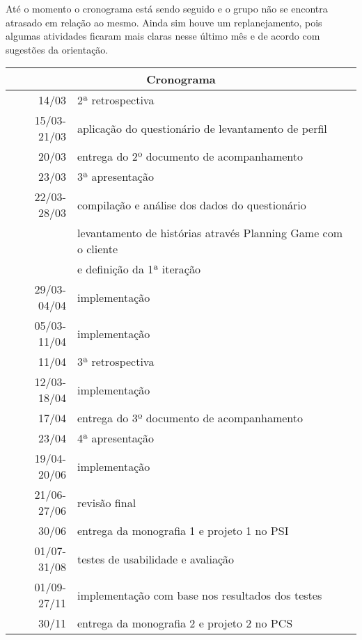 \documentclass[a4paper,12pt,font=plain,header=plain]{abnt}
\begin{document}
		Até o momento o cronograma está sendo seguido e o grupo não se encontra atrasado em relação ao mesmo. Ainda sim houve um replanejamento, pois algumas atividades ficaram mais claras nesse último mês e de acordo com sugestões da orientação.					
		
		\begin{tabular}[|l|]{ |r|l| }
		\hline
			\multicolumn{2}{|c|}{\textbf{Cronograma}} \\
		\hline
			14/03 & 2ª retrospectiva \\
		\hline
			15/03-21/03 & aplicação do questionário de levantamento de perfil \\
		\hline
			20/03 & entrega do 2º documento de acompanhamento \\
		\hline
			23/03 & 3ª apresentação \\
		\hline
			22/03-28/03 & compilação e análise dos dados do questionário \\
			 & levantamento de histórias através Planning Game com o cliente \\ 
			 & e definição da 1ª iteração \\
		\hline
			29/03-04/04 & implementação \\
		\hline
			05/03-11/04 & implementação \\
		\hline
			11/04 & 3ª retrospectiva \\
		\hline
			12/03-18/04 & implementação \\
		\hline
			17/04 & entrega do 3º documento de acompanhamento \\
		\hline
			23/04 & 4ª apresentação \\
		\hline
			19/04-20/06 & implementação \\
		\hline
			21/06-27/06 & revisão final \\
		\hline
			30/06 & entrega da monografia 1 e projeto 1 no PSI \\
		\hline
			01/07-31/08 & testes de usabilidade e avaliação \\
		\hline
			01/09-27/11 & implementação com base nos resultados dos testes \\
		\hline
			30/11 & entrega da monografia 2 e projeto 2 no PCS \\
		\hline
		\end{tabular} \\
\end{document}
